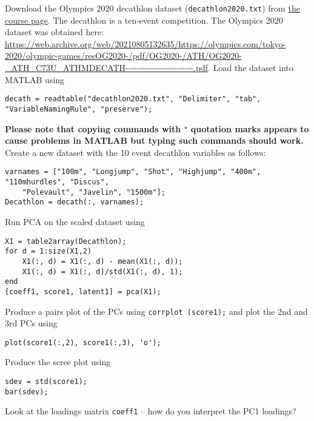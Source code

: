 \documentclass[answers]{exam}
\begin{document}
\begin{questions}
\question%
Download the Olympics 2020 decathlon dataset (\texttt{decathlon2020.txt}) from \href{https://courses.maths.ox.ac.uk/course/view.php?id=620}{the course page}. The decathlon is a ten-event competition. The Olympics 2020 dataset was obtained here: \url{https://web.archive.org/web/20210805132635/https://olympics.com/tokyo-2020/olympic-games/resOG2020-/pdf/OG2020-/ATH/OG2020-\_ATH\_C73U\_ATHMDECATH------------------------.pdf}. Load the dataset into MATLAB using \begin{verbatim}
decath = readtable("decathlon2020.txt", "Delimiter", "tab", "VariableNamingRule", "preserve");
\end{verbatim} \textbf{Please note that copying commands with} \verb|"| \textbf{quotation marks appears to cause problems in MATLAB but typing such commands should work.} Create a new dataset with the 10 event decathlon variables as follows: \begin{verbatim}
varnames = ["100m", "Longjump", "Shot", "Highjump", "400m", "110mhurdles", "Discus",
    "Polevault", "Javelin", "1500m"];
Decathlon = decath(:, varnames);
\end{verbatim} Run PCA on the scaled dataset using \begin{verbatim}
X1 = table2array(Decathlon);
for d = 1:size(X1,2)
    X1(:, d) = X1(:, d) - mean(X1(:, d));
    X1(:, d) = X1(:, d)/std(X1(:, d), 1);
end
[coeff1, score1, latent1] = pca(X1);
\end{verbatim} Produce a pairs plot of the PCs using \verb|corrplot (score1);| and plot the 2nd and 3rd PCs using \begin{verbatim}
plot(score1(:,2), score1(:,3), 'o');
\end{verbatim} Produce the scree plot using \begin{verbatim}
sdev = std(score1);
bar(sdev);
\end{verbatim} Look at the loadings matrix \verb|coeff1| -- how do you interpret the PC1 loadings?




\end{questions}
\end{document}
